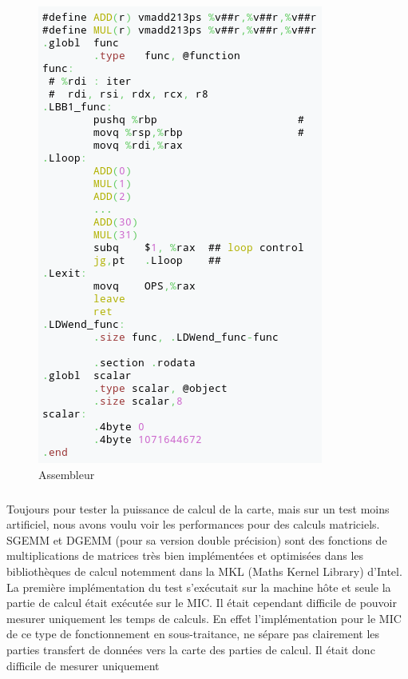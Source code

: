 \documentclass[11pt]{article}
\begin{document}
					\begin{figure}
					\begin{center}
					\includegraphics[scale=0.40]{assembleur.png}
					\caption{Assembleur}
					\end{center}
					\end{figure}
					\subparagraph{}
					Toujours pour tester la puissance de calcul de la carte, mais sur un test moins artificiel, nous avons voulu
					voir les performances pour des calculs matriciels. SGEMM et DGEMM (pour sa version double précision) sont 
					des fonctions de multiplications de matrices très bien implémentées et optimisées dans les bibliothèques de 
					calcul notemment dans la MKL (Maths Kernel Library) d'Intel. \newline
					La première implémentation du test s'exécutait sur la machine hôte et seule la partie de calcul était 
					exécutée sur le MIC. Il était cependant difficile de pouvoir mesurer uniquement les temps de calculs. En effet
					l'implémentation pour le MIC de ce type de fonctionnement en sous-traitance, ne sépare pas clairement les 
					parties transfert de données vers la carte des parties de calcul. Il était donc difficile de mesurer uniquement 
\end{document}
